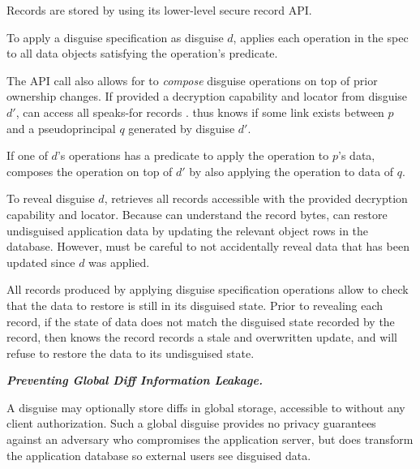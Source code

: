 Records are stored by \sys using its lower-level secure record API.

To apply a disguise specification as disguise $d$, \sys applies each operation in the spec to
all data objects satisfying the operation's predicate. 

The  API call also allows for \sys to \emph{compose} disguise operations on top of
prior ownership changes.
If provided a decryption capability and locator  from disguise $d'$, \sys can access all
speaks-for records
. \sys thus knows if some link exists between $p$ and a pseudoprincipal $q$ generated by
disguise $d'$.

If one of $d$'s operations has a predicate to apply the operation to $p$'s data, \sys
composes the operation on top of $d'$ by also applying the operation to data of $q$.

To reveal disguise $d$, \sys retrieves all records accessible with the provided decryption capability
and locator. Because \sys can understand the record bytes, \sys can restore undisguised application
data by updating the relevant object rows in the database.  However, \sys must be
careful to not accidentally reveal data that has been updated since $d$ was applied.  

All records produced by applying disguise specification operations allow \sys to check that the data
to restore is still in its disguised state. Prior to revealing each record, if the state of data does
not match the disguised state recorded by the record, then \sys knows the record records a stale and
overwritten update, and will refuse to restore the data to its undisguised state.

\iffalse
\vspace{6pt}\noindent\textbf{\emph{Preventing Global Diff Information Leakage.}}

%
A disguise may optionally store diffs in global storage, accessible to \sys without any client
authorization.
Such a global disguise provides no privacy guarantees against an adversary who compromises 
the application server, but does transform the application database so external users see disguised
data.

